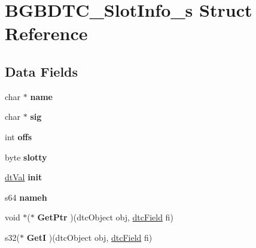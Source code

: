 \hypertarget{structBGBDTC__SlotInfo__s}{\section{B\-G\-B\-D\-T\-C\-\_\-\-Slot\-Info\-\_\-s Struct Reference}
\label{structBGBDTC__SlotInfo__s}
}
\subsection*{Data Fields}
\begin{DoxyCompactItemize}
\item 
\hypertarget{structBGBDTC__SlotInfo__s_ad6bbafbbb573791ea9c7d12b620fb94c}{char $\ast$ {\bfseries name}}\label{structBGBDTC__SlotInfo__s_ad6bbafbbb573791ea9c7d12b620fb94c}

\item 
\hypertarget{structBGBDTC__SlotInfo__s_a8fd750eb5d572eaa780d4851369a3c3a}{char $\ast$ {\bfseries sig}}\label{structBGBDTC__SlotInfo__s_a8fd750eb5d572eaa780d4851369a3c3a}

\item 
\hypertarget{structBGBDTC__SlotInfo__s_a0dc84b891bde927a68eaedfffde35e0e}{int {\bfseries offs}}\label{structBGBDTC__SlotInfo__s_a0dc84b891bde927a68eaedfffde35e0e}

\item 
\hypertarget{structBGBDTC__SlotInfo__s_a62bfa9f1dab8f5b76549fd925d3168d7}{byte {\bfseries slotty}}\label{structBGBDTC__SlotInfo__s_a62bfa9f1dab8f5b76549fd925d3168d7}

\item 
\hypertarget{structBGBDTC__SlotInfo__s_a5cd7c0e2d99e7ffb1dcb85978abafca0}{\hyperlink{unionBGBDT__TagValue__s}{dt\-Val} {\bfseries init}}\label{structBGBDTC__SlotInfo__s_a5cd7c0e2d99e7ffb1dcb85978abafca0}

\item 
\hypertarget{structBGBDTC__SlotInfo__s_ad6da70342bd53a1d52d451e0b97a613b}{s64 {\bfseries nameh}}\label{structBGBDTC__SlotInfo__s_ad6da70342bd53a1d52d451e0b97a613b}

\item 
\hypertarget{structBGBDTC__SlotInfo__s_ae13fa61365cd246ca5b4932f70578ac7}{void $\ast$($\ast$ {\bfseries Get\-Ptr} )(dtc\-Object obj, \hyperlink{structBGBDTC__SlotInfo__s}{dtc\-Field} fi)}\label{structBGBDTC__SlotInfo__s_ae13fa61365cd246ca5b4932f70578ac7}

\item 
\hypertarget{structBGBDTC__SlotInfo__s_abe55401739ddd05ce673417e35a4cf02}{s32($\ast$ {\bfseries Get\-I} )(dtc\-Object obj, \hyperlink{structBGBDTC__SlotInfo__s}{dtc\-Field} fi)}\label{structBGBDTC__SlotInfo__s_abe55401739ddd05ce673417e35a4cf02}


\end{DoxyCompactItemize}
